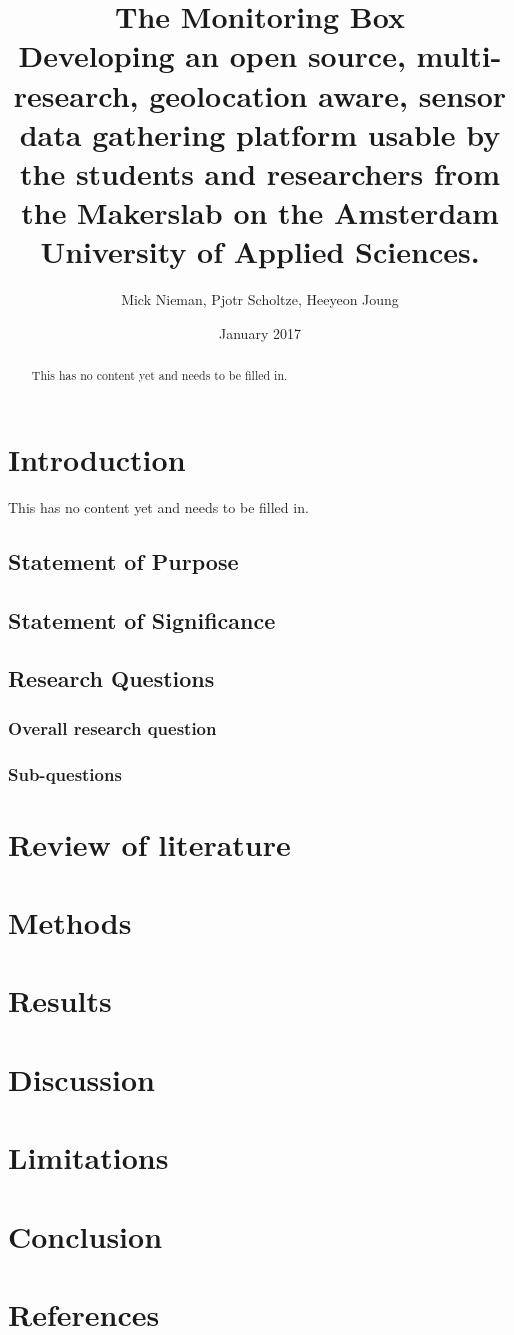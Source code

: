 \documentclass{report}
\title{The Monitoring Box \\ Developing an open source, multi-research, geolocation aware, sensor data gathering platform usable by the students and researchers from the Makerslab on the Amsterdam University of Applied Sciences.}
\author{Mick Nieman, Pjotr Scholtze, Heeyeon Joung}
\date{January 2017}
\begin{document}
\maketitle

\begin{abstract}
    This has no content yet and needs to be filled in. 
\end{abstract}

\tableofcontents

\chapter{Introduction}
This has no content yet and needs to be filled in. 

\section{Statement of Purpose}
\section{Statement of Significance}

\section{Research Questions}
\subsection{Overall research question}
\subsection{Sub-questions}

\chapter{Review of literature}

\chapter{Methods}

\chapter{Results}

\chapter{Discussion}

\chapter{Limitations}

\chapter{Conclusion}

\chapter{References}
\end{document}
